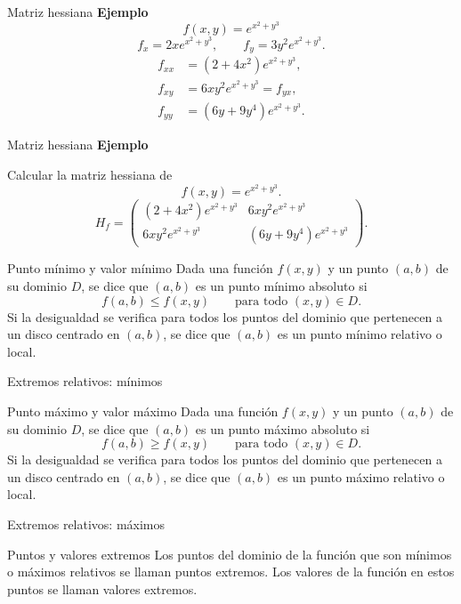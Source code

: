\documentclass[main.tex]{subfiles}
\begin{document}
\begin{frame}{Matriz hessiana}
\small\textbf{Ejemplo}\[f(x,y)=e^{x^2+y^3}\]
\[f_x=2xe^{x^2+y^3},\qquad f_y=3y^2e^{x^2+y^3}.\]
\[\begin{aligned}
f_{xx}&=(2+4x^2)e^{x^2+y^3},\\
f_{xy}&=6xy^2e^{x^2+y^3}=f_{yx},\\
f_{yy}&=(6y+9y^4)e^{x^2+y^3}.
\end{aligned}\]
\end{frame}
\begin{frame}{Matriz hessiana}
\textbf{Ejemplo}\par Calcular la matriz hessiana de
\[f(x,y)=e^{x^2+y^3}.\]
\[H_f=\begin{pmatrix}
(2+4x^2)e^{x^2+y^3}&6xy^2e^{x^2+y^3}\\
6xy^2e^{x^2+y^3}&(6y+9y^4)e^{x^2+y^3}
\end{pmatrix}.\]
\end{frame}
\begin{frame}{Punto mínimo y valor mínimo}
Dada una función $f(x,y)$ y un punto $(a,b)$ de su dominio $D$, se dice que $(a,b)$ es un punto mínimo absoluto si
\[f(a,b)\le f(x,y)\qquad\text{para todo }(x,y)\in D.\]
Si la desigualdad se verifica para todos los puntos del dominio que pertenecen a un disco centrado en $(a,b)$, se dice que $(a,b)$ es un punto mínimo relativo o local.
\end{frame}
\begin{frame}{Extremos relativos: mínimos}
\end{frame}
\begin{frame}{Punto máximo y valor máximo}
Dada una función $f(x,y)$ y un punto $(a,b)$ de su dominio $D$, se dice que $(a,b)$ es un punto máximo absoluto si
\[f(a,b)\ge f(x,y)\qquad\text{para todo }(x,y)\in D.\]
Si la desigualdad se verifica para todos los puntos del dominio que pertenecen a un disco centrado en $(a,b)$, se dice que $(a,b)$ es un punto máximo relativo o local.
\end{frame}
\begin{frame}{Extremos relativos: máximos}
\end{frame}
\begin{frame}{Puntos y valores extremos}
Los puntos del dominio de la función que son mínimos o máximos relativos se llaman puntos extremos. Los valores de la función en estos puntos se llaman valores extremos.
\end{frame}
\end{document}
